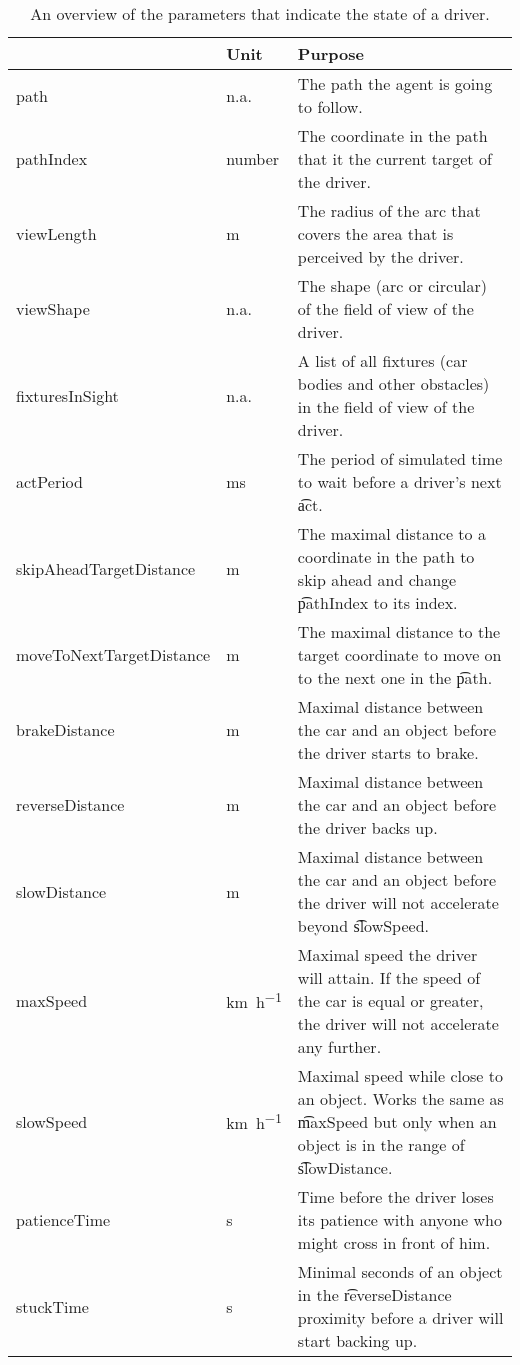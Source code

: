 \begin{table}
	\centering
	\begin{tabularx}{\textwidth}{>{\ttfamily}llX}
		\toprule
		\normalfont{Parameter}	&Unit & Purpose \\ 
		\midrule
		path					
			& n.a. 
			& The path the agent is going to follow. \\
		pathIndex
			& number
			& The coordinate in the path that it the current target of the driver.\\
		viewLength 			
			& \si{\meter}
			& The radius of the arc that covers the area that is perceived by the driver.\\ 
		viewShape
			& n.a.
			& The shape (arc or circular) of the field of view of the driver.\\
		fixturesInSight
			& n.a.
			& A list of all fixtures (car bodies and other obstacles) in the field of view of the driver.\\ 
		actPeriod
			& \si{\milli\second}
			& The period of simulated time to wait before a driver's next \t{act}. \\
		skipAheadTargetDistance
			& \si{\meter}
			& The maximal distance to a coordinate in the path to skip ahead and change \t{pathIndex} to its index. \\
		moveToNextTargetDistance
			& \si{\meter}
			& The maximal distance to the target coordinate to move on to the next one in the \t{path}.\\
		brakeDistance
			& \si{\meter}
			& Maximal distance between the car and an object before the driver starts to brake. \\
		reverseDistance
			& \si{\meter}
			& Maximal distance between the car and an object before the driver backs up.\\
		slowDistance
			& \si{\meter}
			& Maximal distance between the car and an object before the driver will not accelerate beyond \t{slowSpeed}.\\
		maxSpeed
			& \si{\kilo\meter\per\hour}
			& Maximal speed the driver will attain. If the speed of the car is equal or greater, the driver will not accelerate any further.\\
		slowSpeed
			& \si{\kilo\meter\per\hour}
			& Maximal speed while close to an object. Works the same as \t{maxSpeed} but only when an object is in the range of \t{slowDistance}.\\
		patienceTime
			& \si{\second}
			& Time before the driver loses its patience with anyone who might cross in front of him.\\
		stuckTime
			& \si{\second}
			& Minimal seconds of an object in the \t{reverseDistance} proximity before a driver will start backing up.\\
		\bottomrule
	\end{tabularx}
	\caption{An overview of the parameters that indicate the state of a driver.}
	\label{tab:par:method:model:overview:state:lowlevel:driver}
\end{table}

